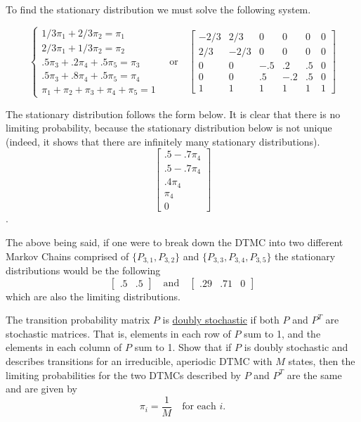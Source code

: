 \documentclass[10pt,a4paper]{exam}
\begin{document}
\begin{questions}
\begin{solution}
To find the stationary distribution we must solve the following system.

$$\begin{cases}
1/3\pi_1 + 2/3\pi_2 = \pi_1\\ 2/3\pi_1 + 1/3\pi_2 = \pi_2\\ .5\pi_3 + .2\pi_4 + .5\pi_5 = \pi_3 \\ .5 \pi_3 + .8\pi_4 + .5\pi_5 = \pi_4 \\ \pi_1 + \pi_2 + \pi_3 + \pi_4 + \pi_5 = 1
\end{cases} \quad \text{or} \quad \begin{bmatrix}
-2/3 & 2/3 & 0 & 0 & 0 & 0\\
2/3 & -2/3 & 0 & 0 & 0 & 0\\
0 & 0 & -.5 & .2 & .5 & 0\\
0 & 0 & .5 & -.2 & .5 & 0\\
1 & 1 & 1 & 1 & 1 & 1
\end{bmatrix}$$

The stationary distribution follows the form below. It is clear that there is no limiting probability, because the stationary distribution below is not unique (indeed, it shows that there are infinitely many stationary distributions).
$$\begin{bmatrix}
.5 - .7\pi_4\\
.5 - .7\pi_4\\
.4\pi_4\\
\pi_4\\
0
\end{bmatrix}$$.

The above being said, if one were to break down the DTMC into two different Markov Chains comprised of $\{P_{3,1}, P_{3,2}\}$ and $\{P_{3,3}, P_{3,4}, P_{3,5}\}$ the stationary distributions would be the following
$$\begin{bmatrix}
.5 & .5
\end{bmatrix} \quad \text{and} \quad \begin{bmatrix}.29 & .71 & 0\end{bmatrix}$$
which are also the limiting distributions.

\end{solution}

\question The transition probability matrix $P$ is \underline{doubly stochastic} if both $P$ and $P^T$ are stochastic matrices. That is, elements in each row of $P$ sum to 1, and the elements in each column of $P$ sum to 1. Show that if $P$ is doubly stochastic and describes transitions for an irreducible, aperiodic DTMC with $M$ states, then the limiting probabilities for the two DTMCs described by $P$ and $P^T$ are the same and are given by 
$$\pi_i = \frac{1}{M} \quad \text{for each } i.$$


\end{questions}
\end{document}
